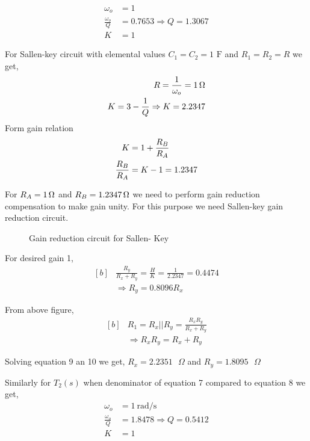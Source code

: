 \documentclass[a4paper,11pt]{article}
\begin{document}
\begin{align*}
    {\omega_o}         & = 1                             \\
    \frac{\omega_o}{Q} & = 0.7653 \Rightarrow Q = 1.3067 \\
    K                  & = 1
\end{align*}


For Sallen-key circuit with elemental values $C_1=C_2=1\text{ F}$ and $R_1=R_2=R$ we get,
\begin{align*}
    R = \frac{1}{\omega_o} = \SI{1}{\ohm} \\
    K = 3 - \frac{1}{Q} \Rightarrow K = 2.2347
\end{align*}
Form gain relation
\begin{align*}
    K                 & = 1 + \frac{R_{B}}{R_{A}} \\
    \frac{R_{B}}{R_{A}} & = K - 1 = 1.2347
\end{align*}

For $ R_{A} = \SI{1}{\ohm}$ and $ R_{B} = \SI{1.2347}{\ohm}$ we need to perform gain reduction {compensation} to make gain unity. For this purpose we need Sallen-key gain reduction circuit.

\begin{figure}[H]
    \centering
    \scalebox{1.65}
    \gainred
    \caption{Gain reduction circuit for Sallen- Key}
\end{figure}


For desired gain 1,
\begin{equation}
    \begin{aligned}[b]
         & \frac{R_y}{R_x+R_y}=\frac{H}{K}=\frac{1}{2.2347}=0.4474 \\
         & \Rightarrow R_y=0.8096 R_x
    \end{aligned}
\end{equation}

From above figure,
\begin{equation}
    \begin{aligned}[b]
         & R_1=R_x||R_y=\frac{R_xR_y}{R_x+R_y} \\
         & \Rightarrow R_xR_y=R_x+R_y
    \end{aligned}
\end{equation}

Solving equation 9 an 10 we get, $R_x=2.2351\text{ }\Omega$ and $R_y=1.8095\text{ }\Omega$

Similarly for $T_2(s)$ when denominator of equation 7 compared to equation 8 we get,
\begin{align*}
    \omega_o           & = \SI{1}{\radian \per \second}  \\
    \frac{\omega_o}{Q} & = 1.8478 \Rightarrow Q = 0.5412 \\
    K                  & = 1
\end{align*}
\end{document}
